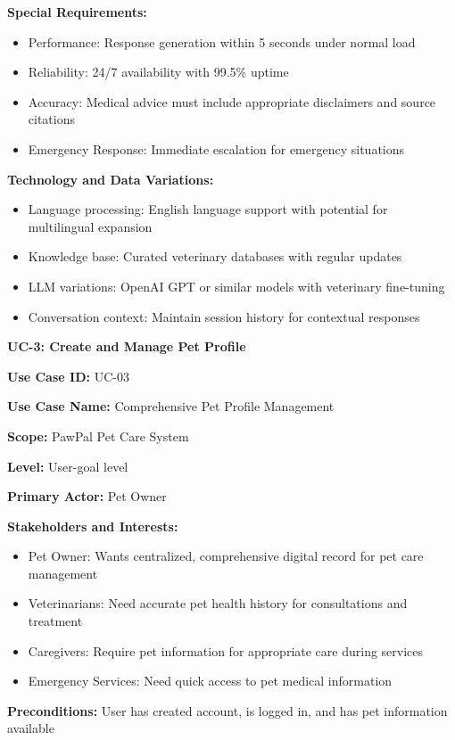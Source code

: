 \textbf{Special Requirements:}
\begin{itemize}
    \item Performance: Response generation within 5 seconds under normal load
    \item Reliability: 24/7 availability with 99.5\% uptime
    \item Accuracy: Medical advice must include appropriate disclaimers and source citations
    \item Emergency Response: Immediate escalation for emergency situations
\end{itemize}

\textbf{Technology and Data Variations:}
\begin{itemize}
    \item Language processing: English language support with potential for multilingual expansion
    \item Knowledge base: Curated veterinary databases with regular updates
    \item LLM variations: OpenAI GPT or similar models with veterinary fine-tuning
    \item Conversation context: Maintain session history for contextual responses
\end{itemize}

\textbf{UC-3: Create and Manage Pet Profile}

\textbf{Use Case ID:} UC-03

\textbf{Use Case Name:} Comprehensive Pet Profile Management

\textbf{Scope:} PawPal Pet Care System

\textbf{Level:} User-goal level

\textbf{Primary Actor:} Pet Owner

\textbf{Stakeholders and Interests:}
\begin{itemize}
    \item Pet Owner: Wants centralized, comprehensive digital record for pet care management
    \item Veterinarians: Need accurate pet health history for consultations and treatment
    \item Caregivers: Require pet information for appropriate care during services
    \item Emergency Services: Need quick access to pet medical information
\end{itemize}

\textbf{Preconditions:} User has created account, is logged in, and has pet information available

